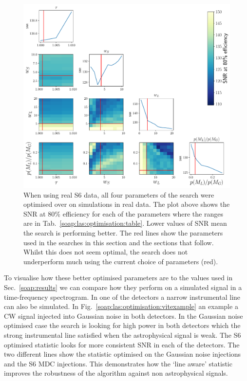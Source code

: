 \begin{figure}[p]
    \centering
    \includegraphics[width=\linewidth]{C3_soap/s6_optimised.pdf}
    \caption[Optimisation of line aware statistic in real S6 data.]{When using real S6 data, all four parameters of the search were optimised over on simulations in real data. The plot above shows the \gls{SNR} at 80\% efficiency for each of the parameters where the ranges are in Tab.~\ref{soap:las:optimisation:table}. Lower values of \gls{SNR} mean the search is performing better. The red lines show the parameters used in the searches in this section and the sections that follow. Whilst this does not seem optimal, the search does not underperform much using the current choice of parameters (red). }
    \label{soap:las:optimisation:s6mdc}
\end{figure}

To visualise how these better optimised parameters are to the values used in Sec.~\ref{soap:results} we can compare how they perform on a simulated signal in a time-frequency spectrogram. 
In one of the detectors a narrow instrumental line can also be simulated.
In Fig.~\ref{soap:las:optimisation:vitexample} an example a \gls{CW} signal injected into Gaussian noise in both detectors. 
In the Gaussian noise optimised case the search is looking for high power in both detectors which the strong instrumental line satisfied when the astrophysical signal is weak. 
The S6 optimised statistic looks for more consistent \gls{SNR} in each of the detectors.
The two different lines show the statistic optimised on the Gaussian noise injections and the S6 \gls{MDC} injections.
This demonstrates how the `line aware' statistic improves the robustness of the algorithm against non astrophysical signals. 

